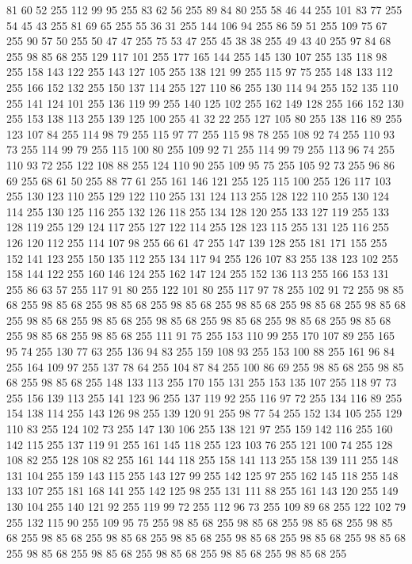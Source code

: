 81 60 52 255 112 99 95 255 83 62 56 255 89 84 80 255 58 46 44 255 101 83 77 255 54 45 43 255 81 69 65 255 55 36 31 255 144 106 94 255 86 59 51 255 109 75 67 255 90 57 50 255 50 47 47 255 75 53 47 255 45 38 38 255 49 43 40 255 97 84 68 255 98 85 68 255 129 117 101 255 177 165 144 255 145 130 107 255 135 118 98 255 158 143 122 255 143 127 105 255 138 121 99 255 115 97 75 255 148 133 112 255 166 152 132 255 150 137 114 255 127 110 86 255 130 114 94 255 152 135 110 255 141 124 101 255 136 119 99 255 140 125 102 255 162 149 128 255 166 152 130 255 153 138 113 255 139 125 100 255 41 32 22 255 127 105 80 255 138 116 89 255 123 107 84 255 114 98 79 255 115 97 77 255 115 98 78 255 108 92 74 255 110 93 73 255 114 99 79 255 115 100 80 255 109 92 71 255 114 99 79 255 113 96 74 255 110 93 72 255 122 108 88 255 124 110 90 255 109 95 75 255 105 92 73 255 96 86 69 255 68 61 50 255 88 77 61 255 161 146 121 255 125 115 100 255
126 117 103 255 130 123 110 255 129 122 110 255 131 124 113 255 128 122 110 255 130 124 114 255 130 125 116 255 132 126 118 255 134 128 120 255 133 127 119 255 133 128 119 255 129 124 117 255 127 122 114 255 128 123 115 255 131 125 116 255 126 120 112 255 114 107 98 255 66 61 47 255 147 139 128 255 181 171 155 255 152 141 123 255 150 135 112 255 134 117 94 255 126 107 83 255 138 123 102 255 158 144 122 255 160 146 124 255 162 147 124 255 152 136 113 255 166 153 131 255 86 63 57 255 117 91 80 255 122 101 80 255 117 97 78 255 102 91 72 255 98 85 68 255 98 85 68 255 98 85 68 255 98 85 68 255 98 85 68 255 98 85 68 255 98 85 68 255 98 85 68 255 98 85 68 255 98 85 68 255 98 85 68 255 98 85 68 255 98 85 68 255 98 85 68 255 98 85 68 255 111 91 75 255 153 110 99 255 170 107 89 255 165 95 74 255 130 77 63 255 136 94 83 255 159 108 93 255 153 100 88 255 161 96 84 255 164 109 97 255 137 78 64 255 104 87 84 255 100 86 69 255 98 85 68 255
98 85 68 255 98 85 68 255 148 133 113 255 170 155 131 255 153 135 107 255 118 97 73 255 156 139 113 255 141 123 96 255 137 119 92 255 116 97 72 255 134 116 89 255 154 138 114 255 143 126 98 255 139 120 91 255 98 77 54 255 152 134 105 255 129 110 83 255 124 102 73 255 147 130 106 255 138 121 97 255 159 142 116 255 160 142 115 255 137 119 91 255 161 145 118 255 123 103 76 255 121 100 74 255 128 108 82 255 128 108 82 255 161 144 118 255 158 141 113 255 158 139 111 255 148 131 104 255 159 143 115 255 143 127 99 255 142 125 97 255 162 145 118 255 148 133 107 255 181 168 141 255 142 125 98 255 131 111 88 255 161 143 120 255 149 130 104 255 140 121 92 255 119 99 72 255 112 96 73 255 109 89 68 255 122 102 79 255 132 115 90 255 109 95 75 255 98 85 68 255 98 85 68 255 98 85 68 255 98 85 68 255 98 85 68 255 98 85 68 255 98 85 68 255 98 85 68 255 98 85 68 255 98 85 68 255 98 85 68 255 98 85 68 255 98 85 68 255 98 85 68 255 98 85 68 255
